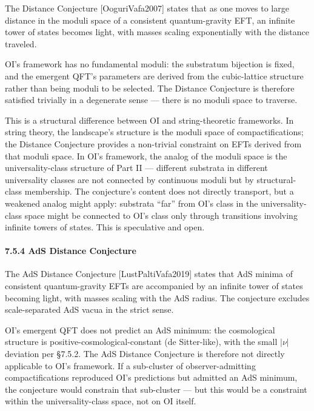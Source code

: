 \documentclass[
]{article}
\begin{document}
The Distance Conjecture {[}OoguriVafa2007{]} states that as one moves to
large distance in the moduli space of a consistent quantum-gravity EFT,
an infinite tower of states becomes light, with masses scaling
exponentially with the distance traveled.

OI's framework has no fundamental moduli: the substratum bijection is
fixed, and the emergent QFT's parameters are derived from the
cubic-lattice structure rather than being moduli to be selected. The
Distance Conjecture is therefore satisfied trivially in a degenerate
sense --- there is no moduli space to traverse.

This is a structural difference between OI and string-theoretic
frameworks. In string theory, the landscape's structure is the moduli
space of compactifications; the Distance Conjecture provides a
non-trivial constraint on EFTs derived from that moduli space. In OI's
framework, the analog of the moduli space is the universality-class
structure of Part II --- different substrata in different universality
classes are not connected by continuous moduli but by structural-class
membership. The conjecture's content does not directly transport, but a
weakened analog might apply: substrata ``far'' from OI's class in the
universality-class space might be connected to OI's class only through
transitions involving infinite towers of states. This is speculative and
open.

\hypertarget{ads-distance-conjecture}{%
\paragraph{7.5.4 AdS Distance
Conjecture}\label{ads-distance-conjecture}}

The AdS Distance Conjecture {[}LustPaltiVafa2019{]} states that AdS
minima of consistent quantum-gravity EFTs are accompanied by an infinite
tower of states becoming light, with masses scaling with the AdS radius.
The conjecture excludes scale-separated AdS vacua in the strict sense.

OI's emergent QFT does not predict an AdS minimum: the cosmological
structure is positive-cosmological-constant (de Sitter-like), with the
small \(|\nu|\) deviation per §7.5.2. The AdS Distance Conjecture is
therefore not directly applicable to OI's framework. If a sub-cluster of
observer-admitting compactifications reproduced OI's predictions but
admitted an AdS minimum, the conjecture would constrain that sub-cluster
--- but this would be a constraint within the universality-class space,
not on OI itself.
\end{document}
